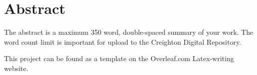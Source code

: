 \chapter*{Abstract}

The abstract is a maximum 350 word, double-spaced summary of your work.  The word count limit is important for upload to the Creighton Digital Repository.

This project can be found as a template on the Overleaf.com Latex-writing website.